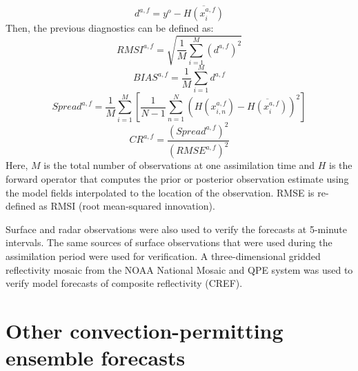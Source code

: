 \begin{equation}
   d^{a,f} = y^o - \overline{H(x_i^{a,f})}
\end{equation}
Then, the previous diagnostics can be defined as:
\begin{equation}
   RMSI^{a,f} = \sqrt{\frac{1}{M}\sum_{i=1}^{M} (d^{a,f})^2} 
\label{rmse}
\end{equation}
\begin{equation}
   BIAS^{a,f} = \frac{1}{M}\sum_{i=1}^{M} d^{a,f}
\label{bias}
\end{equation}
\begin{equation}
   Spread^{a,f} = \frac{1}{M}\sum_{i=1}^{M} [\frac{1}{N-1}\sum_{n=1}^{N}(H(x_{i,n}^{a,f}) - \overline{H(x_i^{a,f})})^2]
\end{equation}
\begin{equation}
   CR^{a,f} = \frac{(Spread^{a,f})^2}{(RMSE^{a,f})^2}
\label{cr}
\end{equation}
Here, \(M\) is the total number of observations at one assimilation time and \(H\) is the forward operator that computes the prior or posterior observation estimate using the model fields interpolated to the location of the observation. RMSE is re-defined as RMSI (root mean-squared innovation).

Surface and radar observations were also used to verify the forecasts at 5-minute intervals. The same sources of surface observations that were used during the assimilation period were used for verification. A three-dimensional gridded reflectivity mosaic from the NOAA National Mosaic and QPE system \citep{zhangetal11} was used to verify model forecasts of composite reflectivity (CREF).

\section{Other convection-permitting ensemble forecasts}
